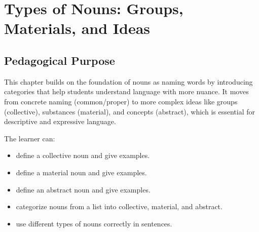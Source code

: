 
\chapter{Types of Nouns: Groups, Materials, and Ideas}

\section{Pedagogical Purpose}
This chapter builds on the foundation of nouns as naming words by introducing categories that help students understand language with more nuance. It moves from concrete naming (common/proper) to more complex ideas like groups (collective), substances (material), and concepts (abstract), which is essential for descriptive and expressive language.

\begin{learningobjectives}
The learner can:
\begin{itemize}
    \item define a collective noun and give examples.
    \item define a material noun and give examples.
    \item define an abstract noun and give examples.
    \item categorize nouns from a list into collective, material, and abstract.
    \item use different types of nouns correctly in sentences.
\end{itemize}
\end{learningobjectives}

